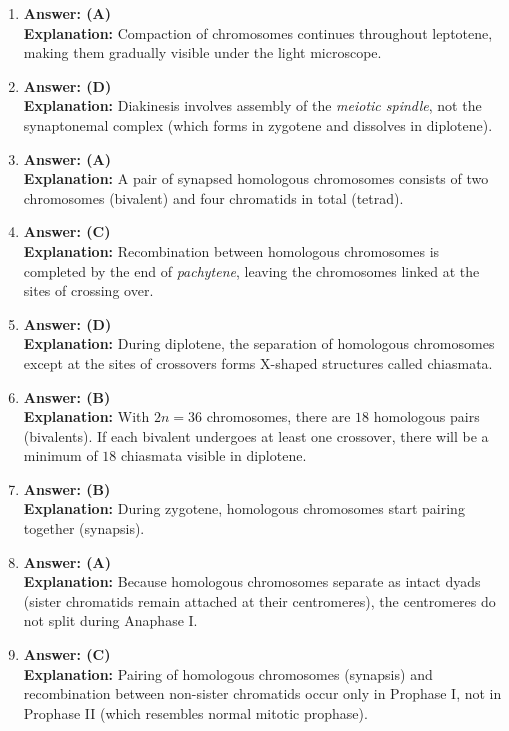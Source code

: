 \documentclass[11pt,a4paper]{article}
\begin{document}
\begin{enumerate}[label=\textbf{\arabic*.}]
\item \textbf{Answer: (A)}\\
\textbf{Explanation:} Compaction of chromosomes continues throughout leptotene, making them gradually visible under the light microscope.

\item \textbf{Answer: (D)}\\
\textbf{Explanation:} Diakinesis involves assembly of the \textit{meiotic spindle}, not the synaptonemal complex (which forms in zygotene and dissolves in diplotene).

\item \textbf{Answer: (A)}\\
\textbf{Explanation:} A pair of synapsed homologous chromosomes consists of two chromosomes (bivalent) and four chromatids in total (tetrad).

\item \textbf{Answer: (C)}\\
\textbf{Explanation:} Recombination between homologous chromosomes is completed by the end of \textit{pachytene}, leaving the chromosomes linked at the sites of crossing over.

\item \textbf{Answer: (D)}\\
\textbf{Explanation:} During diplotene, the separation of homologous chromosomes except at the sites of crossovers forms X-shaped structures called chiasmata.

\item \textbf{Answer: (B)}\\
\textbf{Explanation:} With $2n = 36$ chromosomes, there are $18$ homologous pairs (bivalents). If each bivalent undergoes at least one crossover, there will be a minimum of $18$ chiasmata visible in diplotene.

\item \textbf{Answer: (B)}\\
\textbf{Explanation:} During zygotene, homologous chromosomes start pairing together (synapsis).

\item \textbf{Answer: (A)}\\
\textbf{Explanation:} Because homologous chromosomes separate as intact dyads (sister chromatids remain attached at their centromeres), the centromeres do not split during Anaphase I.

\item \textbf{Answer: (C)}\\
\textbf{Explanation:} Pairing of homologous chromosomes (synapsis) and recombination between non-sister chromatids occur only in Prophase I, not in Prophase II (which resembles normal mitotic prophase).


\end{enumerate}
\end{document}
